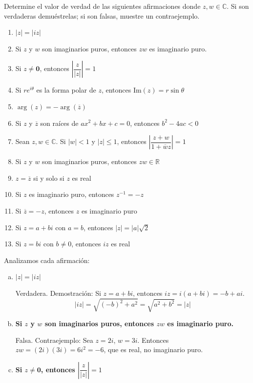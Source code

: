 \begin{prob} 
Determine el valor de verdad de las siguientes afirmaciones donde $z, w \in \mathbb{C}$. Si son verdaderas demuéstrelas; si son falsas, muestre un contraejemplo.

\begin{enumerate}[$a)$]
\item  $|z|=|iz|$
\item  Si $z$ y $w$ son imaginarios puros, entonces $zw$ es imaginario puro.
\item  Si $z\neq \mathbf{0}$, entonces $\left|\dfrac{z}{|z|}\right|=1$
\item  Si $re^{i\theta}$ es la forma polar de $z$, entonces $\text{Im}(z)=r\sin \theta$
\item $\arg(z)=-\arg(\overline{z})$
\item  Si $z$ y $\overline{z}$ son raíces de $ax^2+bx+c=0$, entonces $b^2-4ac<0$
\item  Sean $z, w\in \mathbb{C}$. Si $|w|<1$ y $|z|\leq 1$, entonces $\left|\dfrac{z+w}{1+\overline{w}z}\right|=1$
\item  Si $z$ y $w$ son imaginarios puros, entonces $zw\in \mathbb{R}$
\item  $z=\overline{z}$ si y solo si $z$ es real
\item  Si $z$ es imaginario puro, entonces $z^{-1}=-z$
\item  Si $\overline{z}=-z$, entonces $z$ es imaginario puro
\item  Si $z=a+bi$ con $a=b$, entonces $|z|=|a|\sqrt{2}$
\item  Si $z=bi$ con $b\neq 0$, entonces $iz$ es real
\end{enumerate}
\begin{myproof}
Analizamos cada afirmación:

\begin{enumerate}[a)]
\item \textbf{$|z|=|iz|$}

Verdadera.  
Demostración: Si $z = a + bi$, entonces $iz = i(a+bi) = -b + ai$.  
\[
|iz| = \sqrt{(-b)^2 + a^2} = \sqrt{a^2 + b^2} = |z|
\]

\item \textbf{Si $z$ y $w$ son imaginarios puros, entonces $zw$ es imaginario puro.}

Falsa.  
Contraejemplo: Sea $z = 2i$, $w = 3i$. Entonces $zw = (2i)(3i) = 6i^2 = -6$, que es real, no imaginario puro.

\item \textbf{Si $z\neq \mathbf{0}$, entonces $\left|\dfrac{z}{|z|}\right|=1$}


\end{enumerate}
\end{myproof}
\end{prob}
